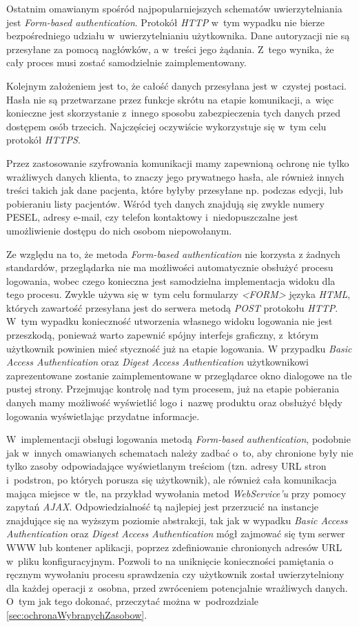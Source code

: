 \documentclass[11pt]{aghdpl}
\begin{document}
Ostatnim omawianym spośród najpopularniejszych schematów uwierzytelniania jest \emph{Form-based authentication}. Protokół \emph{HTTP} w~tym wypadku nie bierze bezpośredniego udziału w~uwierzytelnianiu użytkownika. Dane autoryzacji nie są przesyłane za pomocą nagłówków, a w~treści jego żądania. Z~tego wynika, że cały proces musi zostać samodzielnie zaimplementowany.

Kolejnym założeniem jest to, że całość danych przesyłana jest w~czystej postaci. Hasła nie są przetwarzane przez funkcje skrótu na etapie komunikacji, a~więc konieczne jest skorzystanie z~innego sposobu zabezpieczenia tych danych przed dostępem osób trzecich. Najczęściej oczywiście wykorzystuje się w~tym celu protokół \emph{HTTPS}.

Przez zastosowanie szyfrowania komunikacji mamy zapewnioną ochronę nie tylko wrażliwych danych klienta, to znaczy jego prywatnego hasła, ale również innych treści takich jak dane pacjenta, które byłyby przesyłane np. podczas edycji, lub pobieraniu listy pacjentów. Wśród tych danych znajdują się zwykle numery PESEL, adresy e-mail, czy telefon kontaktowy i~niedopuszczalne jest umożliwienie dostępu do nich osobom niepowołanym.

Ze względu na to, że metoda \emph{Form-based authentication} nie korzysta z żadnych standardów, przeglądarka nie ma możliwości automatycznie obsłużyć procesu logowania, wobec czego konieczna jest samodzielna implementacja widoku dla tego procesu. Zwykle używa się w~tym celu formularzy \emph{<FORM>} języka \emph{HTML}, których zawartość przesyłana jest do serwera metodą \emph{POST} protokołu \emph{HTTP}. W~tym wypadku konieczność utworzenia własnego widoku logowania nie jest przeszkodą, ponieważ warto zapewnić spójny interfejs graficzny, z~którym użytkownik powinien mieć styczność już na etapie logowania. W przypadku \emph{Basic Access Authentication} oraz \emph{Digest Access Authentication} użytkownikowi zaprezentowane zostanie zaimplementowane w przeglądarce okno dialogowe na tle pustej strony. Przejmując kontrolę nad tym procesem, już na etapie pobierania danych mamy możliwość wyświetlić logo i~nazwę produktu oraz obsłużyć błędy logowania wyświetlając przydatne informacje.

W~implementacji obsługi logowania metodą \emph{Form-based authentication}, podobnie jak w~innych omawianych schematach należy zadbać o~to, aby chronione były nie tylko zasoby odpowiadające wyświetlanym treściom (tzn. adresy URL stron i~podstron, po których porusza się użytkownik), ale również cała komunikacja mająca miejsce w~tle, na przykład wywołania metod \emph{WebService'u} przy pomocy zapytań \emph{AJAX}. Odpowiedzialność tą najlepiej jest przerzucić na instancje znajdujące się na wyższym poziomie abstrakcji, tak jak w wypadku \emph{Basic Access Authentication} oraz \emph{Digest Access Authentication} mógł zajmować się tym serwer WWW lub kontener aplikacji, poprzez zdefiniowanie chronionych adresów URL w~pliku konfiguracyjnym. Pozwoli to na uniknięcie konieczności pamiętania o ręcznym wywołaniu procesu sprawdzenia czy użytkownik został uwierzytelniony dla każdej operacji z~osobna, przed zwróceniem potencjalnie wrażliwych danych. O~tym jak tego dokonać, przeczytać można w~podrozdziale \ref{sec:ochronaWybranychZasobow}.
\end{document}

